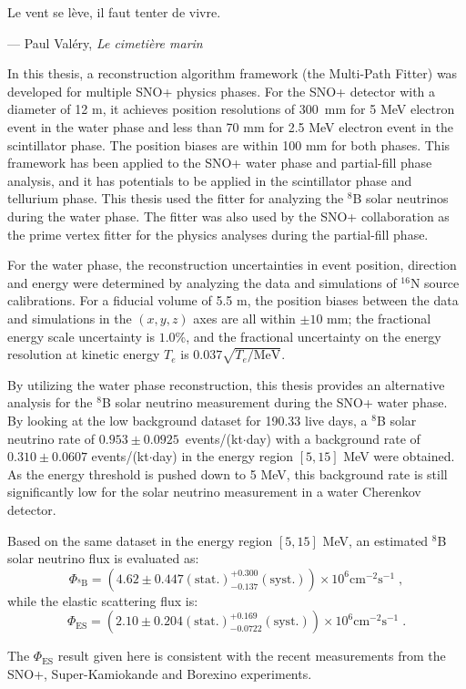 \epigraph{Le vent se l\`{e}ve, il faut tenter de vivre.}{--- \textup{Paul Val\'{e}ry, \textit{Le cimeti\`{e}re marin}}}

In this thesis, a reconstruction algorithm framework (the Multi-Path Fitter) was developed for multiple SNO+ physics phases. For the SNO+ detector with a diameter of 12 m, it achieves position resolutions of 300~mm for 5 MeV electron event in the water phase and less than 70 mm for 2.5 MeV electron event in the scintillator phase. The position biases are within 100 mm for both phases. This framework has been applied to the SNO+ water phase and partial-fill phase analysis, and it has potentials to be applied in the scintillator phase and tellurium phase. This thesis used the fitter for analyzing the $^8$B solar neutrinos during the water phase. The fitter was also used by the SNO+ collaboration as the prime vertex fitter for the physics analyses during the partial-fill phase.

For the water phase, the reconstruction uncertainties in event position, direction and energy were determined by analyzing the data and simulations of $^{16}$N source calibrations. For a fiducial volume of 5.5 m, the position biases between the data and simulations in the $(x,y,z)$ axes are all within $\pm10$ mm; the fractional energy scale uncertainty is $1.0$\%, and the fractional uncertainty on the energy resolution at kinetic energy $T_e$ is $0.037\sqrt{T_e/\mathrm{MeV}}$.

By utilizing the water phase reconstruction, this thesis provides an alternative analysis for the $^8$B solar neutrino measurement during the SNO+ water phase. By looking at the low background dataset for 190.33 live days, a $^8$B solar neutrino rate of $0.953\pm0.0925$~events/(kt$\cdot$day) with a background rate of $0.310\pm 0.0607$ events/(kt$\cdot$day) in the energy region $[5,15]$ MeV were obtained. As the energy threshold is pushed down to 5 MeV, this background rate is still significantly low for the solar neutrino measurement in a water Cherenkov detector.

Based on the same dataset in the energy region $[5,15]$ MeV, an estimated $^8$B solar neutrino flux is evaluated as: 
\begin{equation*}
\Phi_{\mathrm{^8B}}=(4.62 \pm 0.447 \mathrm{(stat.)}^{+0.300}_{-0.137}\mathrm{(syst.)})\times 10^6 \mathrm{cm}^{-2}\mathrm{s}^{-1}\;, 
\end{equation*}
while the elastic scattering flux is:
\begin{equation*}
\Phi_{\mathrm{ES}}=(2.10 \pm 0.204\mathrm{(stat.)}^{+0.169}_{-0.0722}\mathrm{(syst.)})\times 10^6 \mathrm{cm}^{-2}\mathrm{s}^{-1}\;.
\end{equation*}

The $\Phi_{\mathrm{ES}}$ result given here is consistent with the recent measurements from the SNO+, Super-Kamiokande and Borexino experiments.